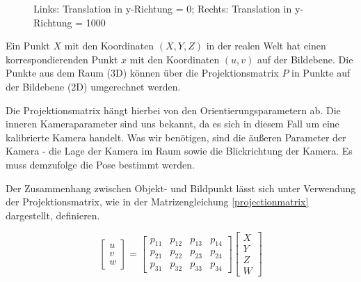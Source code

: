 \documentclass{ezb}
\begin{document}
\begin{figure}[htbp]
	\centering
	\caption{Links: Translation in y-Richtung = 0; Rechts: Translation in y-Richtung = 1000}
	\label{yTranslation}
\end{figure}

Ein Punkt $X$ mit den Koordinaten $(X,Y,Z)$ in der realen Welt hat einen korrespondierenden Punkt $x$ mit den Koordinaten $(u,v)$ auf der Bildebene. Die Punkte aus dem Raum (3D) können über die Projektionsmatrix $P$ in Punkte auf der Bildebene (2D) umgerechnet werden.

Die Projektionsmatrix hängt hierbei von den Orientierungsparametern ab. Die inneren Kameraparameter sind uns bekannt, da es sich in diesem Fall um eine kalibrierte Kamera handelt. Was wir benötigen, sind die äußeren Parameter der Kamera - die Lage der Kamera im Raum sowie die Blickrichtung der Kamera. Es muss demzufolge die Pose bestimmt werden.

Der Zusammenhang zwischen Objekt- und Bildpunkt lässt sich unter Verwendung der Projektionsmatrix, wie in der Matrizengleichung \ref{projectionmatrix} dargestellt, definieren.

\begin{equation} \label{projectionmatrix}
\begin{bmatrix}
u \\
v \\
w 
\end{bmatrix}
=
\begin{bmatrix}
p_{11} & p_{12} & p_{13} & p_{14} \\
p_{21} & p_{22} & p_{23} & p_{24} \\
p_{31} & p_{32} & p_{33} & p_{34} 
\end{bmatrix}
\begin{bmatrix}
X \\
Y \\
Z \\
W
\end{bmatrix}
\end{equation}  
\end{document}
